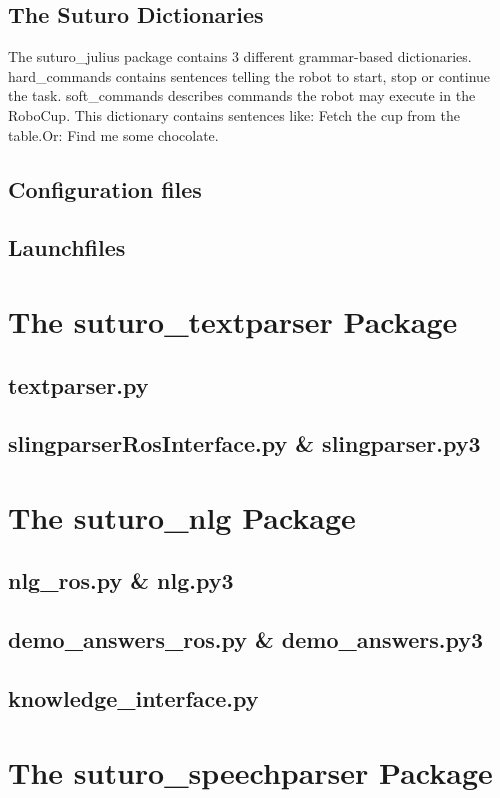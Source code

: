 \documentclass[main.tex]{subfiles}
\begin{document}
		\subsection{The Suturo Dictionaries}
		The suturo\_julius package contains 3 different grammar-based dictionaries. hard\_commands contains sentences telling the robot to start, stop or continue the task.
		soft\_commands describes commands the robot may execute in the RoboCup. This dictionary contains sentences like: Fetch the cup from the table.Or: Find me some chocolate.
		\subsection{Configuration files}
		\subsection{Launchfiles}
	
	\section{The suturo\_textparser Package}
		\subsection{textparser.py}
		\subsection{slingparserRosInterface.py \& slingparser.py3}		
	
	\section{The suturo\_nlg Package}
		\subsection{nlg\_ros.py \& nlg.py3}
		\subsection{demo\_answers\_ros.py \& demo\_answers.py3}
		\subsection{knowledge\_interface.py}
			
	\section{The suturo\_speechparser Package}
		
\end{document}
